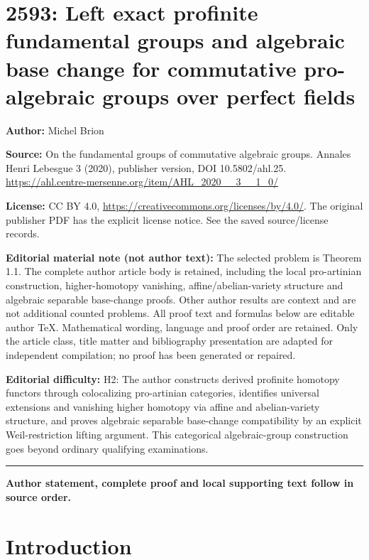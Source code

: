 \documentclass[11pt]{article}
\theoremstyle{definition}
\numberwithin{equation}{section}
\theoremstyle{remark}
\begin{document}
\section*{2593: Left exact profinite fundamental groups and algebraic base change for commutative pro-algebraic groups over perfect fields}
\noindent\textbf{Author:} Michel Brion\par\noindent\textbf{Source:} On the fundamental groups of commutative algebraic groups. Annales Henri Lebesgue 3 (2020), publisher version, DOI 10.5802/ahl.25. \url{https://ahl.centre-mersenne.org/item/AHL_2020__3__1_0/}
\par\noindent\textbf{License:} CC BY 4.0, \url{https://creativecommons.org/licenses/by/4.0/}. The original publisher PDF has the explicit license notice. See the saved source/license records.
\par\noindent\textbf{Editorial material note (not author text):} The selected problem is Theorem 1.1. The complete author article body is retained, including the local pro-artinian construction, higher-homotopy vanishing, affine/abelian-variety structure and algebraic separable base-change proofs. Other author results are context and are not additional counted problems. All proof text and formulas below are editable author TeX. Mathematical wording, language and proof order are retained. Only the article class, title matter and bibliography presentation are adapted for independent compilation; no proof has been generated or repaired.
\par\noindent\textbf{Editorial difficulty:} H2: The author constructs derived profinite homotopy functors through colocalizing pro-artinian categories, identifies universal extensions and vanishing higher homotopy via affine and abelian-variety structure, and proves algebraic separable base-change compatibility by an explicit Weil-restriction lifting argument. This categorical algebraic-group construction goes beyond ordinary qualifying examinations.
\medskip\hrule\medskip
\noindent\textbf{Author statement, complete proof and local supporting text follow in source order.}
\section{Introduction}\label{sec:int}
\end{document}
